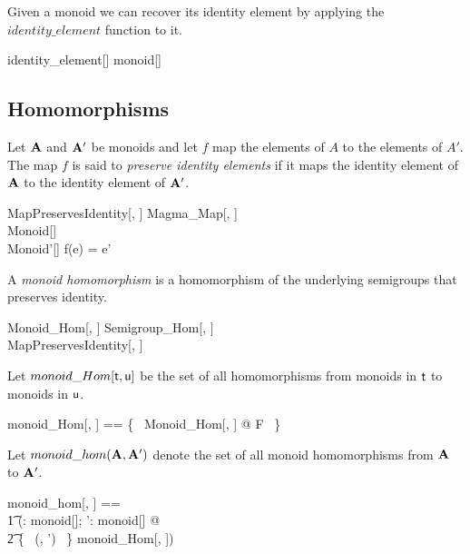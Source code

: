 \documentclass{amsart}
\begin{document}
\begin{remark}
Given a monoid we can recover its identity element by applying the $identity\_element$
function to it.

\begin{zed}
	identity\_element[\setT] \in monoid[\setT] \fun \setT
\end{zed}

\end{remark}

\subsection{Homomorphisms}

Let $\mathbf{A}$ and $\mathbf{A}'$ be monoids and let $f$ map the elements of $A$ to the elements of $A'$.
The map $f$ is said to \textit{preserve identity elements} if it maps the identity element of $\mathbf{A}$
to the identity element of $\mathbf{A}'$.

\begin{schema}{MapPreservesIdentity}[\genT, \genU]
	Magma\_Map[\genT, \genU] \\
	Monoid[\genT] \\
	Monoid'[\genU]
\where
	f(e) = e'
\end{schema}

A {\em monoid homomorphism} is a homomorphism of the underlying semigroups
that preserves identity.

\begin{schema}{Monoid\_Hom}[\genT, \genU]
	Semigroup\_Hom[\genT, \genU] \\
	 MapPreservesIdentity[\genT, \genU]
\end{schema}

Let $monoid\_Hom[\mathsf{t}, \mathsf{u}]$ be the set of all homomorphisms from monoids in $\mathsf{t}$
to monoids in $\mathsf{u}$.

\begin{zed}
	monoid\_Hom[\genT, \genU] == \{~ Monoid\_Hom[\genT, \genU] @ F ~\}
\end{zed}

Let $monoid\_hom(\mathbf{A}, \mathbf{A}')$ denote the set of all monoid homomorphisms from $\mathbf{A}$ to $\mathbf{A}'$.

\begin{zed}
	monoid\_hom[\genT, \genU] == \\
	\t1	(\lambda \strucA: monoid[\genT]; \strucA': monoid[\genU] @ \\
	\t2		\{~ (\strucA, \strucA') ~\} \dres monoid\_Hom[\genT, \genU])
\end{zed}
\end{document}
